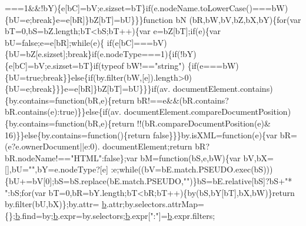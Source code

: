 \begin{DoxyCode}
      ===1&&!bY)\{e[bC]=bV;e.sizset=bT\}\textcolor{keywordflow}{if}(e.nodeName.toLowerCase()===bW)\{bU=e;\textcolor{keywordflow}{break}\}e=e[bR]\}bZ[bT]=bU\}\}\}\textcolor{keyword}{function} bN
      (bR,bW,bV,bZ,bX,bY)\{\textcolor{keywordflow}{for}(var bT=0,bS=bZ.length;bT<bS;bT++)\{var e=bZ[bT];\textcolor{keywordflow}{if}(e)\{var bU=\textcolor{keyword}{false};e=e[bR];\textcolor{keywordflow}{while}(e)\{\textcolor{keywordflow}{
      if}(e[bC]===bV)\{bU=bZ[e.sizset];\textcolor{keywordflow}{break}\}\textcolor{keywordflow}{if}(e.nodeType===1)\{\textcolor{keywordflow}{if}(!bY)\{e[bC]=bV;e.sizset=bT\}\textcolor{keywordflow}{if}(typeof bW!==\textcolor{stringliteral}{"string"})
      \{\textcolor{keywordflow}{if}(e===bW)\{bU=\textcolor{keyword}{true};\textcolor{keywordflow}{break}\}\}\textcolor{keywordflow}{else}\{\textcolor{keywordflow}{if}(by.filter(bW,[e]).length>0)\{bU=e;\textcolor{keywordflow}{break}\}\}\}e=e[bR]\}bZ[bT]=bU\}\}\}\textcolor{keywordflow}{if}(av.
      documentElement.contains)\{by.contains=\textcolor{keyword}{function}(bR,e)\{\textcolor{keywordflow}{return} bR!==e&&(bR.contains?bR.contains(e):\textcolor{keyword}{true})\}\}\textcolor{keywordflow}{else}\{\textcolor{keywordflow}{if}(av.
      documentElement.compareDocumentPosition)\{by.contains=\textcolor{keyword}{function}(bR,e)\{\textcolor{keywordflow}{return} !!(bR.compareDocumentPosition(e)&
      16)\}\}\textcolor{keywordflow}{else}\{by.contains=\textcolor{keyword}{function}()\{\textcolor{keywordflow}{return} \textcolor{keyword}{false}\}\}\}by.isXML=\textcolor{keyword}{function}(e)\{var bR=(e?e.ownerDocument||e:0).
      documentElement;\textcolor{keywordflow}{return} bR?bR.nodeName!==\textcolor{stringliteral}{"HTML"}:\textcolor{keyword}{false}\};var bM=\textcolor{keyword}{function}(bS,e,bW)\{var bV,bX=[],bU=\textcolor{stringliteral}{""},bY=e.nodeType?[e]
      :e;\textcolor{keywordflow}{while}((bV=bE.match.PSEUDO.exec(bS)))\{bU+=bV[0];bS=bS.replace(bE.match.PSEUDO,\textcolor{stringliteral}{""})\}bS=bE.relative[bS]?bS+\textcolor{stringliteral}{"*
      "}:bS;\textcolor{keywordflow}{for}(var bT=0,bR=bY.length;bT<bR;bT++)\{by(bS,bY[bT],bX,bW)\}\textcolor{keywordflow}{return} by.filter(bU,bX)\};by.attr=
      \hyperlink{jquery_8js_aa4026ad5544b958e54ce5e106fa1c805}{b}.attr;by.selectors.attrMap=\{\};\hyperlink{jquery_8js_aa4026ad5544b958e54ce5e106fa1c805}{b}.find=by;\hyperlink{jquery_8js_aa4026ad5544b958e54ce5e106fa1c805}{b}.expr=by.selectors;\hyperlink{jquery_8js_aa4026ad5544b958e54ce5e106fa1c805}{b}.expr[\textcolor{stringliteral}{":"}]=\hyperlink{jquery_8js_aa4026ad5544b958e54ce5e106fa1c805}{b}.expr.filters;

\end{DoxyCode}
